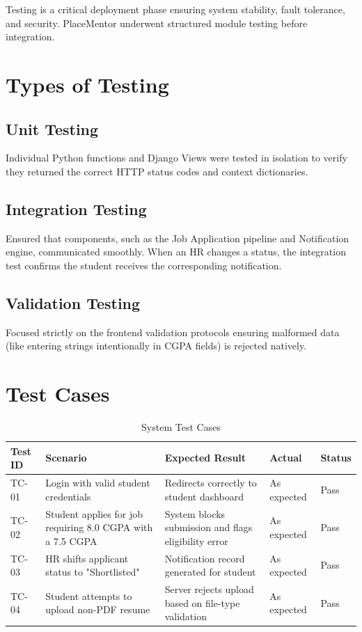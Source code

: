 \documentclass[a4paper,12pt]{report}
\begin{document}
Testing is a critical deployment phase ensuring system stability, fault tolerance, and security. PlaceMentor underwent structured module testing before integration.

\section{Types of Testing}

\subsection{Unit Testing}
Individual Python functions and Django Views were tested in isolation to verify they returned the correct HTTP status codes and context dictionaries.

\subsection{Integration Testing}
Ensured that components, such as the Job Application pipeline and Notification engine, communicated smoothly. When an HR changes a status, the integration test confirms the student receives the corresponding notification.

\subsection{Validation Testing}
Focused strictly on the frontend validation protocols ensuring malformed data (like entering strings intentionally in CGPA fields) is rejected natively.

\section{Test Cases}

\begin{table}[H]
\centering
\caption{System Test Cases}
\vspace{8pt}
\label{tab:testcases}
\renewcommand{\arraystretch}{1.3}
\begin{tabular}{|p{1.5cm}|p{3.5cm}|p{4cm}|p{2cm}|p{2cm}|}
\hline
\textbf{Test ID} & \textbf{Scenario} & \textbf{Expected Result} & \textbf{Actual} & \textbf{Status} \\
\hline
TC-01 & Login with valid student credentials & Redirects correctly to student dashboard & As expected & Pass \\
\hline
TC-02 & Student applies for job requiring 8.0 CGPA with a 7.5 CGPA & System blocks submission and flags eligibility error & As expected & Pass \\
\hline
TC-03 & HR shifts applicant status to "Shortlisted" & Notification record generated for student & As expected & Pass \\
\hline
TC-04 & Student attempts to upload non-PDF resume & Server rejects upload based on file-type validation & As expected & Pass \\
\hline
\end{tabular}
\end{table}
\end{document}
